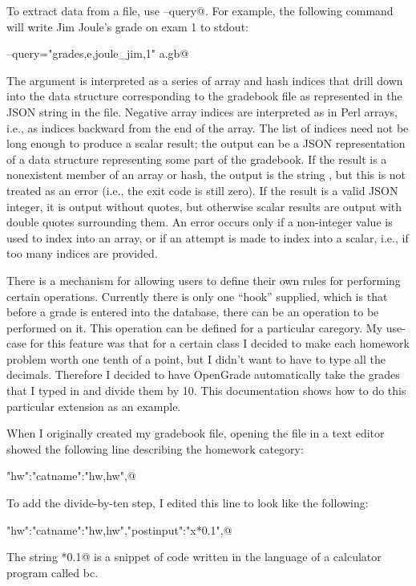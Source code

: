 \documentclass{opengrade_doc}
\begin{document}
To extract data from a file, use \verb@--query@. For example, the following
command will write
Jim Joule's grade on exam 1 to stdout:

\verb@opengrade --query="grades,e,joule_jim,1" a.gb@

The argument is interpreted as a series of array and hash indices
that drill down into the data structure corresponding to the gradebook
file as represented in the JSON string in the file. Negative array indices
are interpreted as in Perl arrays, i.e., as indices backward from the end
of the array. The list of indices need not be long enough to produce a
scalar result; the output can be a JSON representation of a data structure
representing some part of the gradebook. If the result is a nonexistent member
of an array or hash,
the output is the string \verb@null@, but this is not treated as an error
(i.e., the exit code is still zero). If the result is a valid JSON
integer, it is output without quotes, but otherwise scalar results
are output with double quotes surrounding them. An error occurs only if
a non-integer value is used to index into an array, or if an attempt
is made to index into a scalar, i.e., if too many indices are provided.

\label{extensions}
There is a mechanism for allowing users to define their own rules for
performing certain operations. Currently there is only one ``hook''
supplied, which is that before a grade is entered into the database,
there can be an operation to be performed on it. This operation
can be defined for a particular caregory. My use-case for
this feature was that for a certain class I decided to make each
homework problem worth one tenth of a point, but I didn't want to have
to type all the decimals. Therefore I decided to have OpenGrade automatically
take the grades that I typed in and divide them by 10. This documentation
shows how to do this particular extension as an example.

When I originally created my gradebook file, opening the file in
a text editor showed the following line describing the homework category:

\verb@"hw":{"catname":"hw,hw"},@

To add the divide-by-ten step, I edited this line to look like the following:

\verb@"hw":{"catname":"hw,hw","postinput":"x*0.1"},@

The string \verb@x*0.1@ is a snippet of code written in the language of a
calculator program called bc. 
\end{document}
